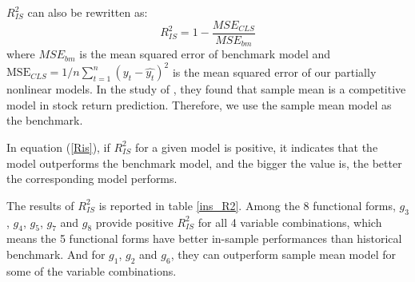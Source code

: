 \documentclass[a4paper,12pt,times,numbered,print,index]{report}
\numberwithin{equation}{section}
\begin{document}

$R^2_{IS}$ can also be rewritten as:
\begin{equation}
	R_{IS}^{2}=1-\frac{MSE_{CLS}}{MSE_{bm}}
	\label{Ris}
\end{equation}
where $MSE_{bm}$ is the mean squared error of benchmark model and $\mathrm{MSE}_{CLS}=1 / n \sum_{t=1}^{n}\left(y_{t}-\hat{y_t}\right)^{2}$ is the mean squared error of our partially nonlinear models. 
In the study of \cite{welch2008comprehensive}, they found that sample mean is a competitive model in stock return prediction. Therefore, we use the sample mean model as the benchmark. 

In equation (\ref{Ris}), if $R^2_{IS}$ for a given model is positive, it indicates that the model outperforms the benchmark model, and the bigger the value is, the better the corresponding model performs.

The results of $R^2_{IS}$ is reported in table \ref{ins_R2}. Among the 8 functional forms, $g_3$, $g_4$, $g_5$, $g_7$ and $g_8$ provide positive $R^2_{IS}$ for all 4 variable combinations, which means the 5 functional forms have better in-sample performances than historical benchmark. And for $g_1$, $g_2$ and $g_6$, they can outperform sample mean model for some of the variable combinations. 


\end{document}
